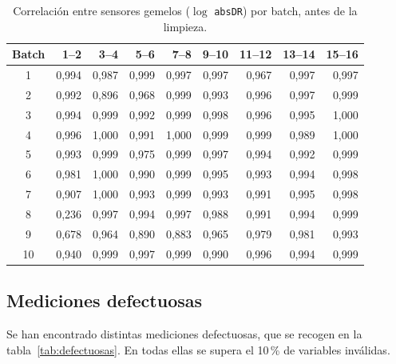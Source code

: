 \begin{table}[H]
\centering
\caption{Correlación entre sensores gemelos ($\log$ \texttt{absDR}) por batch, antes de la limpieza.}
\label{tab:gemelos}
\begin{tabular}{crrrrrrrr}
\toprule
Batch & 1--2 & 3--4 & 5--6 & 7--8 & 9--10 & 11--12 & 13--14 & 15--16 \\
\midrule
1  & 0,994 & 0,987 & 0,999 & 0,997 & 0,997 & 0,967 & 0,997 & 0,997 \\
2  & 0,992 & 0,896 & 0,968 & 0,999 & 0,993 & 0,996 & 0,997 & 0,999 \\
3  & 0,994 & 0,999 & 0,992 & 0,999 & 0,998 & 0,996 & 0,995 & 1,000 \\
4  & 0,996 & 1,000 & 0,991 & 1,000 & 0,999 & 0,999 & 0,989 & 1,000 \\
5  & 0,993 & 0,999 & 0,975 & 0,999 & 0,997 & 0,994 & 0,992 & 0,999 \\
6  & 0,981 & 1,000 & 0,990 & 0,999 & 0,995 & 0,993 & 0,994 & 0,998 \\
7  & 0,907 & 1,000 & 0,993 & 0,999 & 0,993 & 0,991 & 0,995 & 0,998 \\
8  & 0,236 & 0,997 & 0,994 & 0,997 & 0,988 & 0,991 & 0,994 & 0,999 \\
9  & 0,678 & 0,964 & 0,890 & 0,883 & 0,965 & 0,979 & 0,981 & 0,993 \\
10 & 0,940 & 0,999 & 0,997 & 0,999 & 0,990 & 0,996 & 0,994 & 0,999 \\
\bottomrule
\end{tabular}
\end{table}

\subsection{Mediciones defectuosas}

Se han encontrado distintas mediciones defectuosas, que se recogen en la
tabla~\ref{tab:defectuosas}. En todas ellas se supera el 10\,\% de variables inválidas.


